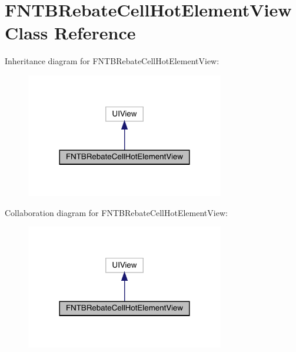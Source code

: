 \hypertarget{interface_f_n_t_b_rebate_cell_hot_element_view}{}\section{F\+N\+T\+B\+Rebate\+Cell\+Hot\+Element\+View Class Reference}
\label{interface_f_n_t_b_rebate_cell_hot_element_view}


Inheritance diagram for F\+N\+T\+B\+Rebate\+Cell\+Hot\+Element\+View\+:\nopagebreak
\begin{figure}[H]
\begin{center}
\leavevmode
\includegraphics[width=245pt]{interface_f_n_t_b_rebate_cell_hot_element_view__inherit__graph}
\end{center}
\end{figure}


Collaboration diagram for F\+N\+T\+B\+Rebate\+Cell\+Hot\+Element\+View\+:\nopagebreak
\begin{figure}[H]
\begin{center}
\leavevmode
\includegraphics[width=245pt]{interface_f_n_t_b_rebate_cell_hot_element_view__coll__graph}
\end{center}
\end{figure}
